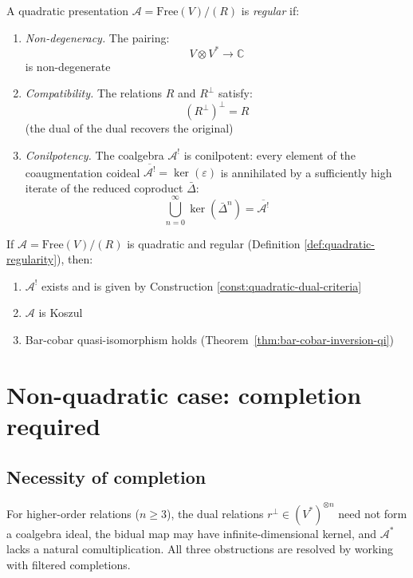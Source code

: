 \begin{definition}\label{def:quadratic-regularity}
A quadratic presentation $\mathcal{A} = \text{Free}(V) / (R)$ is \emph{regular} if:
\begin{enumerate}
\item \emph{Non-degeneracy.} The pairing:
      \[V \otimes V^* \to \mathbb{C}\]
      is non-degenerate
      
\item \emph{Compatibility.} The relations $R$ and $R^\perp$ satisfy:
      \[(R^\perp)^\perp = R\]
      (the dual of the dual recovers the original)
      
\item \emph{Conilpotency.} The coalgebra $\mathcal{A}^!$ is conilpotent: every element
      of the coaugmentation coideal $\overline{\mathcal{A}^!} = \ker(\varepsilon)$ is
      annihilated by a sufficiently high iterate of the reduced coproduct $\bar{\Delta}$:
      \[\bigcup_{n=0}^\infty \ker(\bar{\Delta}^n) = \overline{\mathcal{A}^!}\]
\end{enumerate}
\end{definition}

\begin{theorem}\label{thm:regular-implies-koszul}
If $\mathcal{A} = \text{Free}(V) / (R)$ is quadratic and regular (Definition 
\ref{def:quadratic-regularity}), then:
\begin{enumerate}
\item $\mathcal{A}^!$ exists and is given by Construction \ref{const:quadratic-dual-criteria}
\item $\mathcal{A}$ is Koszul
\item Bar-cobar quasi-isomorphism holds (Theorem~\ref{thm:bar-cobar-inversion-qi})
\end{enumerate}
\end{theorem}


\section{Non-quadratic case: completion required}
\label{sec:non-quadratic-existence}

\subsection{Necessity of completion}

\begin{remark}\label{rem:non-quadratic-obstructions}
For higher-order relations ($n \ge 3$), the dual relations $r^\perp \in (V^*)^{\otimes n}$ need not form a coalgebra ideal, the bidual map may have infinite-dimensional kernel, and $\mathcal{A}^*$ lacks a natural comultiplication.  All three obstructions are resolved by working with filtered completions.
\end{remark}

